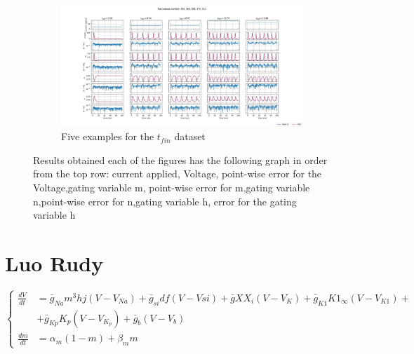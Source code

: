 \documentclass{article}
\begin{document}
\newpage
\begin{figure}
    \begin{subfigure}{.5\textwidth}

        \centering
        \includegraphics[width=1.8\linewidth]{images/t_f_error_HH.jpg}
        \caption{Five examples for the $t_{fin}$ dataset}
        \label{HH_err_t_f}
    \end{subfigure}
    \caption{Results obtained each of the figures has the following graph in order from the top row: current applied, Voltage, point-wise error for the Voltage,gating variable m, point-wise error for m,gating variable n,point-wise error for n,gating variable h, error for the gating variable h}
    \label{Grafici HH}
\end{figure}

\clearpage
\section{Luo Rudy}

\begin{center}
    $\begin{cases}
            \frac{dV}{dt} & =\bar{g}_{Na}m^3hj(V-V_{Na}) + \bar{g}_{si}df(V-V{si}) + \bar{g}XX_i(V-V_K) + \bar{g}_{K1}K1_{\infty}(V-V_{K1})+ \\[10pt] &+ \bar{g}_{Kp}K_p(V-V_{K_p}) + \bar{g}_b(V-V_b)\\[10pt]
            \frac{dm}{dt} & = \alpha_m (1-m) + \beta_m m
        \end{cases}$
\end{center}
\end{document}
